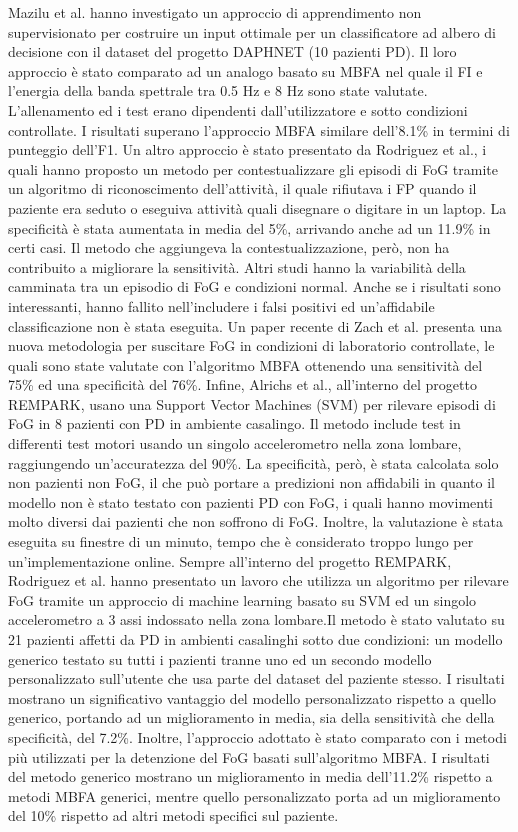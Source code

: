 Mazilu et al.\cite{50} hanno investigato un approccio di apprendimento non supervisionato per costruire un input ottimale per un classificatore ad albero di decisione con il dataset del progetto DAPHNET (10 pazienti PD). Il loro approccio è stato comparato ad un analogo basato su MBFA nel quale il FI e l'energia della banda spettrale tra 0.5 Hz e 8 Hz sono state valutate. L'allenamento ed i test erano dipendenti dall'utilizzatore e sotto condizioni controllate. I risultati superano l'approccio MBFA similare dell'8.1\% in termini di punteggio dell'F1. Un altro approccio è stato presentato da Rodriguez et al., i quali hanno proposto un metodo per contestualizzare gli episodi di FoG tramite un algoritmo di riconoscimento dell'attività, il quale rifiutava i FP quando il paziente era seduto o eseguiva attività quali disegnare o digitare in un laptop. La specificità è stata aumentata in media del 5\%, arrivando anche ad un 11.9\% in certi casi\cite{50}. Il metodo che aggiungeva la contestualizzazione, però, non ha contribuito a migliorare la sensitività. Altri studi hanno la variabilità della camminata tra un episodio di FoG e condizioni normal. Anche se i risultati sono interessanti, hanno fallito nell'includere i falsi positivi ed un'affidabile classificazione non è stata eseguita\cite{53,54}. Un paper recente di Zach et al. presenta una nuova metodologia per suscitare FoG in condizioni di laboratorio controllate, le quali sono state valutate con l'algoritmo MBFA ottenendo una sensitività del 75\% ed una specificità del 76\%\cite{31}. \newline
Infine, Alrichs et al., all'interno del progetto REMPARK\cite{55}, usano una Support Vector Machines (SVM) per rilevare episodi di FoG in 8 pazienti con PD in ambiente casalingo. Il metodo include test in differenti test motori usando un singolo accelerometro nella zona lombare, raggiungendo un'accuratezza del 90\%. La specificità, però, è stata calcolata solo non pazienti non FoG, il che può portare a predizioni non affidabili in quanto il modello non è stato testato con pazienti PD con FoG, i quali hanno movimenti molto diversi dai pazienti che non soffrono di FoG. Inoltre, la valutazione è stata eseguita su finestre di un minuto, tempo che è considerato troppo lungo per un'implementazione online\cite{28}. Sempre all'interno del progetto REMPARK, Rodriguez et al. hanno presentato un lavoro che utilizza un algoritmo per rilevare FoG tramite un approccio di machine learning basato su SVM ed un singolo accelerometro a 3 assi indossato nella zona lombare\cite{HD}.Il metodo è stato valutato su 21 pazienti affetti da PD in ambienti casalinghi sotto due condizioni: un modello generico testato su tutti i pazienti tranne uno ed un secondo modello personalizzato sull'utente che usa parte del dataset del paziente stesso. I risultati mostrano un significativo vantaggio del modello personalizzato rispetto a quello generico, portando ad un miglioramento in media, sia della sensitività che della specificità, del 7.2\%. Inoltre, l'approccio adottato è stato comparato con i metodi più utilizzati per la detenzione del FoG basati sull'algoritmo MBFA. I risultati del metodo generico mostrano un miglioramento in media dell'11.2\% rispetto a metodi MBFA generici, mentre quello personalizzato porta ad un miglioramento del 10\% rispetto ad altri metodi specifici sul paziente.